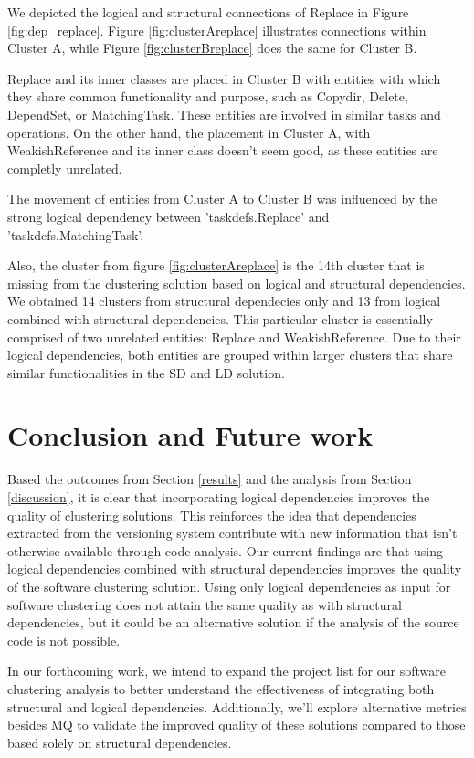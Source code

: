 \documentclass[conference]{IEEEtran}
\begin{document}
We depicted the logical and structural connections of Replace in Figure \ref{fig:dep_replace}. Figure \ref{fig:clusterAreplace} illustrates connections within Cluster A, while Figure \ref{fig:clusterBreplace} does the same for Cluster B.

Replace and its inner classes are placed in Cluster B with entities with which they share common functionality and purpose, such as Copydir, Delete, DependSet, or MatchingTask. These entities are involved in similar tasks and operations. On the other hand, the placement in Cluster A, with WeakishReference and its inner class doesn't seem good, as these entities are completly unrelated.  

The movement of entities from Cluster A to Cluster B was influenced by the strong logical dependency between 'taskdefs.Replace' and 'taskdefs.MatchingTask'.


Also, the cluster from figure \ref{fig:clusterAreplace} is the 14th cluster that is missing from the clustering solution based on logical and structural dependencies. We obtained 14 clusters from structural dependecies only and 13 from logical combined with structural dependencies. This particular cluster is essentially comprised of two unrelated entities: Replace and WeakishReference. Due to their logical dependencies, both entities are grouped within larger clusters that share similar functionalities in the SD and LD solution.



\section{Conclusion and Future work}
\label{conclusion}

Based the outcomes from Section \ref{results} and the analysis from Section \ref{discussion}, it is clear that incorporating logical dependencies improves the quality of clustering solutions. 
This reinforces the idea that dependencies extracted from the versioning system contribute with new information that isn't otherwise available through code analysis.  Our current findings are that using logical dependencies combined with structural dependencies improves the quality of the software clustering solution. Using only logical dependencies as input for software clustering does not attain the same quality as with structural dependencies, but it could be an alternative solution if the analysis of the source code is not possible.

In our forthcoming work, we intend to expand the project list for our software clustering analysis to better understand the effectiveness of integrating both structural and logical dependencies. Additionally, we'll explore alternative metrics besides MQ to validate the improved quality of these solutions compared to those based solely on structural dependencies.



\end{document}
